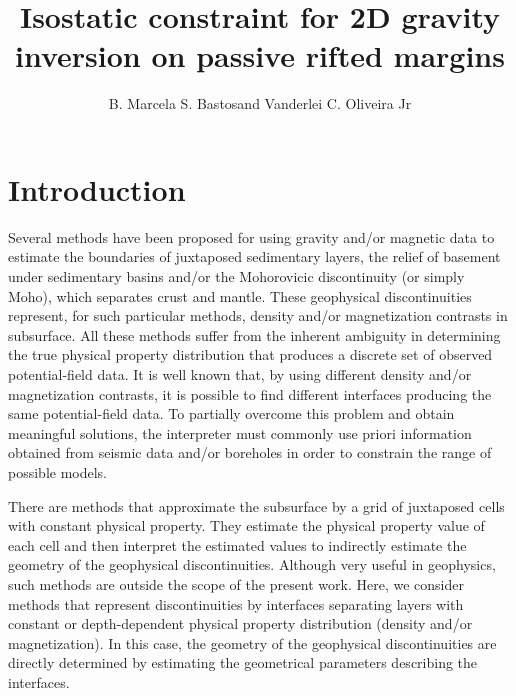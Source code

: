 \documentclass[manuscript]{geophysics}
\begin{document}
\title{Isostatic constraint for 2D gravity inversion on passive rifted margins}

\renewcommand{\thefootnote}{\fnsymbol{footnote}} 


\address{
\footnotemark[1]Observat\'{o}rio Nacional, \\
Department of Geophysics, \\
Rio de Janeiro, Brazil}
\author{B. Marcela S. Bastos\footnotemark[1] and Vanderlei C. Oliveira Jr\footnotemark[1]}


\maketitle

\begin{abstract}

\lipsum[1]

\end{abstract}

\section{Introduction}

Several methods have been proposed for using gravity and/or magnetic data to estimate
the boundaries of juxtaposed sedimentary layers, the relief of basement under sedimentary 
basins and/or the Mohorovicic discontinuity (or simply Moho), which separates crust and 
mantle.
These geophysical discontinuities represent, for such particular methods, 
density and/or magnetization contrasts in subsurface.
All these methods suffer from the inherent ambiguity \citep{roy1962, skeels1962} in
determining the true physical property distribution that produces a discrete set of
observed potential-field data. 
It is well known that, by using different density and/or magnetization contrasts, 
it is possible to
find different interfaces producing the same potential-field data. 
To partially overcome this problem and obtain meaningful solutions, the interpreter
must commonly use priori information obtained from seismic data and/or boreholes in
order to constrain the range of possible models.

There are methods that approximate the subsurface by a grid of
juxtaposed cells with constant physical property. 
They estimate the physical property value of each cell and then 
interpret the estimated values to indirectly estimate the geometry of the 
geophysical discontinuities.
Although very useful in geophysics, such methods are
outside the scope of the present work.
Here, we consider methods that represent discontinuities by interfaces 
separating layers with constant or depth-dependent physical property distribution 
(density and/or magnetization).
In this case, the geometry of the geophysical discontinuities are directly determined
by estimating the geometrical parameters describing the interfaces.
\end{document}
